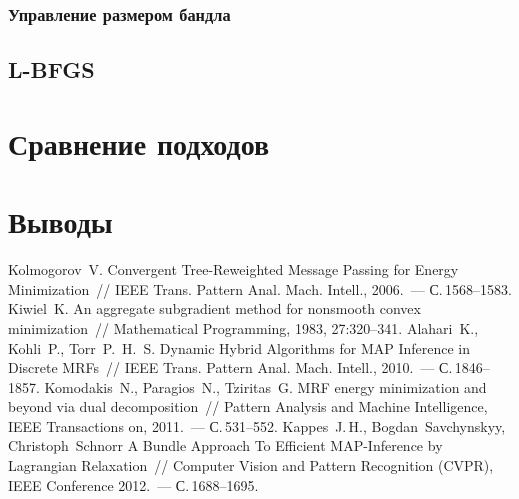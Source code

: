 \documentclass{article}
\begin{document}
\subsubsection{Управление размером бандла}

\subsection{L-BFGS}


\section{Сравнение подходов}

\section{Выводы}

\begin{thebibliography}{1}
    {Kolmogorov~V.}
    {Convergent Tree-Reweighted Message Passing for Energy Minimization}~//
    {IEEE} Trans. Pattern Anal. Mach. Intell., 2006.~--- С.\,1568--1583.
    {Kiwiel~K.}
    {An aggregate subgradient method for nonsmooth convex minimization}~//
    Mathematical Programming, 1983, 27:320--341.
    {Alahari~K., Kohli~P., Torr~P.~H.~S.}
    {Dynamic Hybrid Algorithms for MAP Inference in Discrete MRFs}~//
    {IEEE} Trans. Pattern Anal. Mach. Intell., 2010.~--- С.\,1846--1857.
    {Komodakis~N., Paragios~N., Tziritas~G.}
    {MRF energy minimization and beyond via dual decomposition}~//
    Pattern Analysis and Machine Intelligence, IEEE Transactions on, 2011.~--- С.\,531--552.
    {Kappes~J.\,H., Bogdan~Savchynskyy, Christoph~Schnorr}
    {A Bundle Approach To Efficient MAP-Inference by Lagrangian Relaxation}~//
    Computer Vision and Pattern Recognition (CVPR), IEEE Conference 2012.~--- С.\,1688--1695.
\end{thebibliography}
\end{document}
